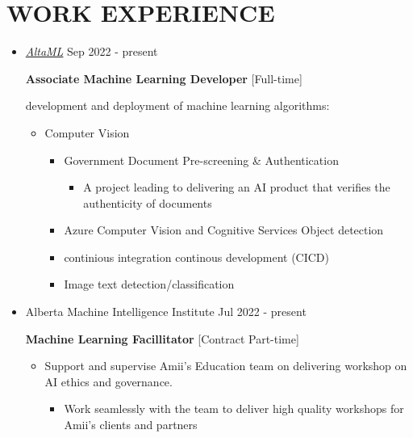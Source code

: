 \documentclass[11pt,a4paper,sans]{moderncv} %
\begin{document}
	\section{WORK EXPERIENCE}
	\begin{itemize}
		\item \href{http://altaml.com/}{ \emph{AltaML}} \hfill Sep 2022 - present
		
		\textbf{Associate Machine Learning Developer} [Full-time]
		
		development and deployment of machine learning algorithms: 
		\begin{itemize}
			\item Computer Vision
			\begin{itemize}
				\item Government Document Pre-screening \& Authentication
				\begin{itemize}
				    \item A project leading to delivering an AI product that verifies the authenticity of documents
				\end{itemize}
				\item {} Azure Computer Vision and Cognitive Services Object detection
				\item continious integration continous development (CICD)
				\item Image text detection/classification
			\end{itemize}
		\end{itemize}
		
		\item \href{https://amii.ca/}{} Alberta Machine Intelligence Institute \hfill Jul 2022 - present
		
        \textbf{Machine Learning Facillitator} [Contract Part-time]
        \begin{itemize}
			\item Support and supervise Amii's Education team on delivering workshop on AI ethics and governance.
			\begin{itemize}
			    \item Work seamlessly with the team to deliver high quality workshops for Amii's clients and partners
			\end{itemize}
            

\end{itemize}
\end{itemize}
\end{document}
